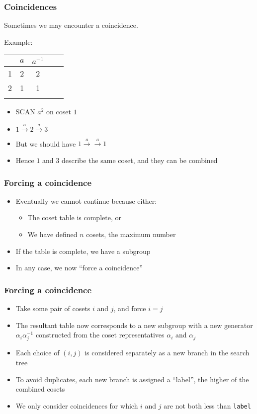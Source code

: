 \documentclass{beamer}
\begin{document}
\begin{frame}
  \frametitle{Coincidences}
  Sometimes we may encounter a coincidence.

  Example:
  \begin{table}
    \begin{tabular}{r | c c c c}
      & $a$ & $a^{-1}$ \\ \hline
      1 & 2 & 2\\
      2 & \phantom{3} 1 \phantom{1} & 1 \\ \\
    \end{tabular}
  \end{table}
  
  \begin{itemize}
  \item SCAN $a^2$ on coset $1$ 
  \item $ 1 \overset{a}{\rightarrow} 2 \overset{a}{\rightarrow} 3$ 
  \item But we should have $ 1 \overset{a}{\rightarrow} \overset{a}{\rightarrow} 1$ 
  \item Hence $1$ and $3$ describe the same coset, and they can be combined
  \end{itemize}
\end{frame}

\begin{frame}
  \frametitle{Forcing a coincidence}
  \begin{itemize}
  \item Eventually we cannot continue because either:
    \begin{itemize}
    \item The coset table is complete\pause, or
    \item We have defined $n$ cosets, the maximum number
    \end{itemize}
  \item If the table is complete, we have a subgroup \pause
  \item In any case, we now ``force a coincidence''
  \end{itemize}
\end{frame}

\begin{frame}
  \frametitle{Forcing a coincidence}
  \begin{itemize}
  \item Take some pair of cosets $i$ and $j$, and force $i=j$ \pause
  \item The resultant table now corresponds to a new subgroup with a new generator $\alpha_i \alpha_j^{-1}$ constructed from the coset representatives $\alpha_i$ and $\alpha_j$ \pause
  \item Each choice of $(i,j)$ is considered separately as a new branch in the search tree \pause
  \item To avoid duplicates, each new branch is assigned a ``label'', the higher of the combined cosets \pause
  \item We only consider coincidences for which $i$ and $j$ are not both less than \texttt{label}
  \end{itemize}
\end{frame}
\end{document}
